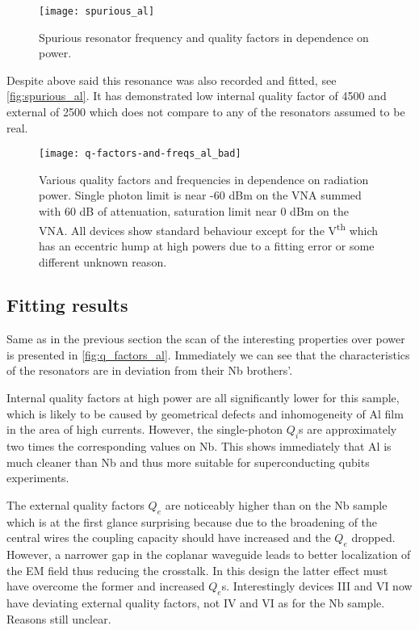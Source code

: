 \documentclass[12pt]{article}
\numberwithin{equation}{section}
\numberwithin{figure}{section}
\begin{document}
\begin{figure}
\centering
\texttt{[image: spurious\_al]}
\caption{Spurious resonator frequency and quality factors in dependence on power.}
\label{fig:spurious_al}
\end{figure}

Despite above said this resonance was also recorded and fitted, see \autoref{fig:spurious_al}. It has demonstrated low internal quality factor of 4500 and external of 2500 which does not compare to any of the resonators assumed to be real.

\begin{figure}
\hspace{-0.7cm}
\texttt{[image: q-factors-and-freqs\_al\_bad]}
\caption{Various quality factors and frequencies in dependence on radiation power. Single photon limit is near -60 dBm on the VNA summed with 60 dB of attenuation, saturation limit near 0 dBm on the VNA. All devices show standard behaviour except for the V\textsuperscript{th} which has an eccentric hump at high powers due to a fitting error or some different unknown reason.}
\label{fig:q_factors_al}
\end{figure}

\subsection{Fitting results}

Same as in the previous section the scan of the interesting properties over power is presented in \autoref{fig:q_factors_al}. Immediately we can see that the characteristics of the resonators are in deviation from their Nb brothers'. 

Internal quality factors at high power are all significantly lower for this sample, which is likely to be caused by geometrical defects and inhomogeneity of Al film in the area of high currents. However, the single-photon $Q_i$s are approximately two times the corresponding values on Nb. This shows immediately that Al is much cleaner than Nb and thus more suitable for superconducting qubits experiments. 

The external quality factors $Q_e$ are noticeably higher than on the Nb sample which is at the first glance surprising because due to the broadening of the central wires the coupling capacity should have increased and the $Q_e$ dropped. However, a narrower gap in the coplanar waveguide leads to better localization of the EM field thus reducing the crosstalk. In this design the latter effect must have overcome the former and increased $Q_e$s. Interestingly devices III and VI now have deviating external quality factors, not IV and VI as for the Nb sample. Reasons still unclear.
	
\end{document}

